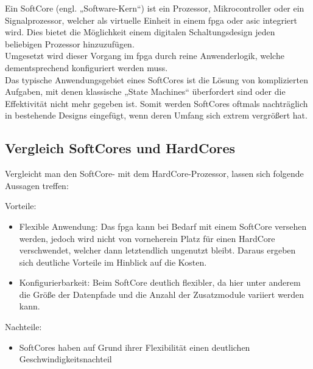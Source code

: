 Ein SoftCore (engl. „Software-Kern“) ist ein Prozessor, Mikrocontroller oder ein Signalprozessor, welcher als virtuelle Einheit in einem \ac{fpga} oder \ac{asic} integriert wird.
Dies bietet die Möglichkeit einem digitalen Schaltungsdesign jeden beliebigen Prozessor hinzuzufügen.\\
Umgesetzt wird dieser Vorgang im \ac{fpga} durch reine Anwenderlogik,
welche dementsprechend konfiguriert werden muss.\\
Das typische Anwendungsgebiet eines SoftCores ist die Lösung von komplizierten Aufgaben, mit denen klassische „State Machines“ überfordert sind oder die Effektivität
 nicht mehr gegeben ist. Somit werden SoftCores oftmals nachträglich in bestehende Designs eingefügt, wenn deren Umfang sich extrem vergrößert hat.\cite{softcore}\\

\subsection{Vergleich SoftCores und HardCores}\label{kap:vergleich}

Vergleicht man den SoftCore- mit dem HardCore-Prozessor, lassen sich folgende Aussagen treffen:

Vorteile:
\begin{itemize}
   \item Flexible Anwendung: Das \ac{fpga} kann bei Bedarf mit einem SoftCore versehen werden, jedoch wird nicht von vorneherein Platz für einen HardCore verschwendet, welcher
    dann letztendlich ungenutzt bleibt. Daraus ergeben sich deutliche Vorteile im Hinblick auf die Kosten.
    \item Konfigurierbarkeit: Beim SoftCore deutlich flexibler, da hier unter anderem die Größe der Datenpfade und die Anzahl der Zusatzmodule variiert werden kann.
 \end{itemize}


Nachteile:
\begin{itemize}
  \item SoftCores haben auf Grund ihrer Flexibilität einen deutlichen Geschwindigkeitsnachteil
\end{itemize}

